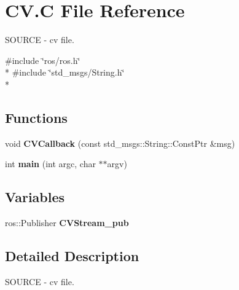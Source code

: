 \hypertarget{CV_8C}{\section{C\-V.\-C File Reference}
\label{CV_8C}
}


S\-O\-U\-R\-C\-E -\/ cv file.  


{\ttfamily \#include \char`\"{}ros/ros.\-h\char`\"{}}\\*
{\ttfamily \#include \char`\"{}std\-\_\-msgs/\-String.\-h\char`\"{}}\\*
\subsection*{Functions}
\begin{DoxyCompactItemize}
\item 
\hypertarget{CV_8C_a77009212af45d6269d56d92dbadba018}{void {\bfseries C\-V\-Callback} (const std\-\_\-msgs\-::\-String\-::\-Const\-Ptr \&msg)}\label{CV_8C_a77009212af45d6269d56d92dbadba018}

\item 
\hypertarget{CV_8C_a3c04138a5bfe5d72780bb7e82a18e627}{int {\bfseries main} (int argc, char $\ast$$\ast$argv)}\label{CV_8C_a3c04138a5bfe5d72780bb7e82a18e627}

\end{DoxyCompactItemize}
\subsection*{Variables}
\begin{DoxyCompactItemize}
\item 
\hypertarget{CV_8C_a85c99c78793120993218165ca0e4c3c4}{ros\-::\-Publisher {\bfseries C\-V\-Stream\-\_\-pub}}\label{CV_8C_a85c99c78793120993218165ca0e4c3c4}

\end{DoxyCompactItemize}


\subsection{Detailed Description}
S\-O\-U\-R\-C\-E -\/ cv file. 